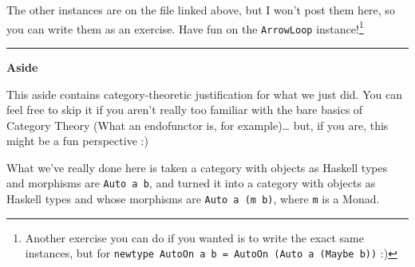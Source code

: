 \documentclass[]{article}
\newenvironment{Shaded}{}{}
\newcommand{\CommentTok}[1]{\textcolor[rgb]{0.38,0.63,0.69}{\textit{#1}}}
\newcommand{\DataTypeTok}[1]{\textcolor[rgb]{0.56,0.13,0.00}{#1}}
\newcommand{\FunctionTok}[1]{\textcolor[rgb]{0.02,0.16,0.49}{#1}}
\newcommand{\KeywordTok}[1]{\textcolor[rgb]{0.00,0.44,0.13}{\textbf{#1}}}
\newcommand{\NormalTok}[1]{#1}
\newcommand{\OperatorTok}[1]{\textcolor[rgb]{0.40,0.40,0.40}{#1}}
\newcommand{\OtherTok}[1]{\textcolor[rgb]{0.00,0.44,0.13}{#1}}
\begin{document}
\begin{Shaded}
\end{Shaded}

The other instances are on the file linked above, but I won't post them here, so
you can write them as an exercise. Have fun on the \texttt{ArrowLoop}
instance!\footnote{Another exercise you can do if you wanted is to write the
  exact same instances, but for
  \texttt{newtype\ AutoOn\ a\ b\ =\ AutoOn\ (Auto\ a\ (Maybe\ b))} :)}

\begin{center}\rule{0.5\linewidth}{0.5pt}\end{center}

\textbf{Aside}

This aside contains category-theoretic justification for what we just did. You
can feel free to skip it if you aren't really too familiar with the bare basics
of Category Theory (What an endofunctor is, for example)\ldots{} but, if you
are, this might be a fun perspective :)

What we've really done here is taken a category with objects as Haskell types
and morphisms are \texttt{Auto\ a\ b}, and turned it into a category with
objects as Haskell types and whose morphisms are \texttt{Auto\ a\ (m\ b)}, where
\texttt{m} is a Monad.
\end{document}
